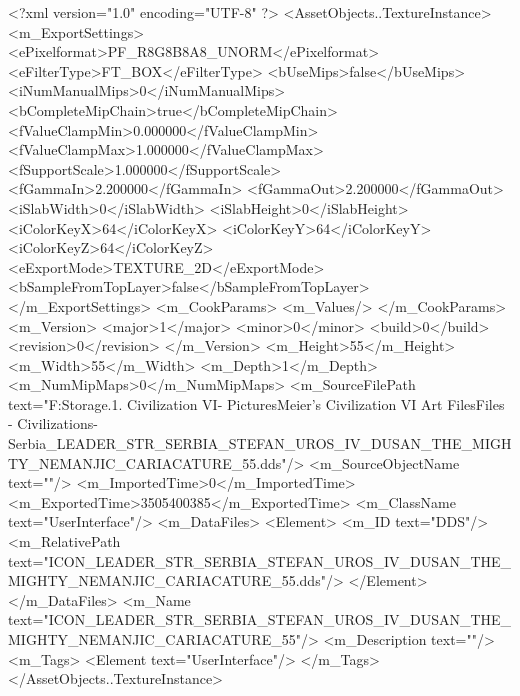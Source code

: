 <?xml version="1.0" encoding="UTF-8" ?>
<AssetObjects..TextureInstance>
	<m_ExportSettings>
		<ePixelformat>PF_R8G8B8A8_UNORM</ePixelformat>
		<eFilterType>FT_BOX</eFilterType>
		<bUseMips>false</bUseMips>
		<iNumManualMips>0</iNumManualMips>
		<bCompleteMipChain>true</bCompleteMipChain>
		<fValueClampMin>0.000000</fValueClampMin>
		<fValueClampMax>1.000000</fValueClampMax>
		<fSupportScale>1.000000</fSupportScale>
		<fGammaIn>2.200000</fGammaIn>
		<fGammaOut>2.200000</fGammaOut>
		<iSlabWidth>0</iSlabWidth>
		<iSlabHeight>0</iSlabHeight>
		<iColorKeyX>64</iColorKeyX>
		<iColorKeyY>64</iColorKeyY>
		<iColorKeyZ>64</iColorKeyZ>
		<eExportMode>TEXTURE_2D</eExportMode>
		<bSampleFromTopLayer>false</bSampleFromTopLayer>
	</m_ExportSettings>
	<m_CookParams>
		<m_Values/>
	</m_CookParams>
	<m_Version>
		<major>1</major>
		<minor>0</minor>
		<build>0</build>
		<revision>0</revision>
	</m_Version>
	<m_Height>55</m_Height>
	<m_Width>55</m_Width>
	<m_Depth>1</m_Depth>
	<m_NumMipMaps>0</m_NumMipMaps>
	<m_SourceFilePath text="F:\Mod Storage\2.1. Civilization VI\Mods\Archive - Pictures\Sid Meier's Civilization VI Art Files\Art Files - Civilizations\Civilization - Serbia\ICON_LEADER_STR_SERBIA_STEFAN_UROS_IV_DUSAN_THE_MIGHTY_NEMANJIC_CARIACATURE_55.dds"/>
	<m_SourceObjectName text=""/>
	<m_ImportedTime>0</m_ImportedTime>
	<m_ExportedTime>3505400385</m_ExportedTime>
	<m_ClassName text="UserInterface"/>
	<m_DataFiles>
		<Element>
			<m_ID text="DDS"/>
			<m_RelativePath text="ICON_LEADER_STR_SERBIA_STEFAN_UROS_IV_DUSAN_THE_MIGHTY_NEMANJIC_CARIACATURE_55.dds"/>
		</Element>
	</m_DataFiles>
	<m_Name text="ICON_LEADER_STR_SERBIA_STEFAN_UROS_IV_DUSAN_THE_MIGHTY_NEMANJIC_CARIACATURE_55"/>
	<m_Description text=""/>
	<m_Tags>
		<Element text="UserInterface"/>
	</m_Tags>
</AssetObjects..TextureInstance>

